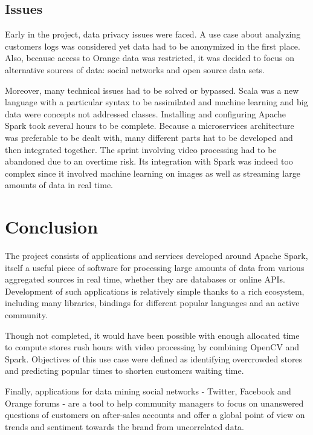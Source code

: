 \documentclass[11pt]{article}
\begin{document}
\subsection{Issues}

Early in the project, data privacy issues were faced. A use case about analyzing customers logs was considered yet data had to be anonymized in the first place. Also, because access to Orange data was restricted, it was decided to focus on alternative sources of data: social networks and open source data sets.

Moreover, many technical issues had to be solved or bypassed. Scala was a new language with a particular syntax to be assimilated and machine learning and big data were concepts not addressed classes.
Installing and configuring Apache Spark took several hours to be complete. Because a microservices architecture was preferable to be dealt with, many different parts hat to be developed and then integrated together.
The sprint involving video processing had to be abandoned due to an overtime risk. Its integration with Spark was indeed too complex since it involved machine learning on images as well as streaming large amounts of data in real time.

\section{Conclusion}

The project consists of applications and services developed around Apache Spark, itself a useful piece of software for processing large amounts of data from various aggregated sources in real time, whether they are databases or online APIs. Development of such applications is relatively simple thanks to a rich ecosystem, including many libraries, bindings for different popular languages and an active community.

Though not completed, it would have been possible with enough allocated time to compute stores rush hours with video processing by combining OpenCV and Spark. Objectives of this use case were defined as identifying overcrowded stores and predicting popular times to shorten customers waiting time.

Finally, applications for data mining social networks - Twitter, Facebook and Orange forums - are a tool to help community managers to focus on unanswered questions of customers on after-sales accounts and offer a global point of view on trends and sentiment towards the brand from uncorrelated data.
\end{document}
